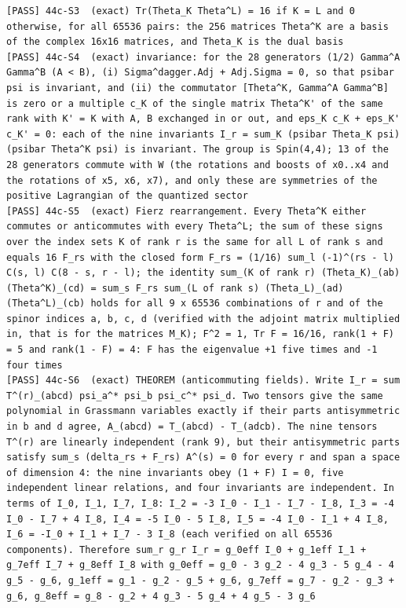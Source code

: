 \documentclass[
  10pt,
]{article}
\begin{document}
\begin{verbatim}
[PASS] 44c-S3  (exact) Tr(Theta_K Theta^L) = 16 if K = L and 0 otherwise, for all 65536 pairs: the 256 matrices Theta^K are a basis of the complex 16x16 matrices, and Theta_K is the dual basis
[PASS] 44c-S4  (exact) invariance: for the 28 generators (1/2) Gamma^A Gamma^B (A < B), (i) Sigma^dagger.Adj + Adj.Sigma = 0, so that psibar psi is invariant, and (ii) the commutator [Theta^K, Gamma^A Gamma^B] is zero or a multiple c_K of the single matrix Theta^K' of the same rank with K' = K with A, B exchanged in or out, and eps_K c_K + eps_K' c_K' = 0: each of the nine invariants I_r = sum_K (psibar Theta_K psi)(psibar Theta^K psi) is invariant. The group is Spin(4,4); 13 of the 28 generators commute with W (the rotations and boosts of x0..x4 and the rotations of x5, x6, x7), and only these are symmetries of the positive Lagrangian of the quantized sector
[PASS] 44c-S5  (exact) Fierz rearrangement. Every Theta^K either commutes or anticommutes with every Theta^L; the sum of these signs over the index sets K of rank r is the same for all L of rank s and equals 16 F_rs with the closed form F_rs = (1/16) sum_l (-1)^(rs - l) C(s, l) C(8 - s, r - l); the identity sum_(K of rank r) (Theta_K)_(ab) (Theta^K)_(cd) = sum_s F_rs sum_(L of rank s) (Theta_L)_(ad) (Theta^L)_(cb) holds for all 9 x 65536 combinations of r and of the spinor indices a, b, c, d (verified with the adjoint matrix multiplied in, that is for the matrices M_K); F^2 = 1, Tr F = 16/16, rank(1 + F) = 5 and rank(1 - F) = 4: F has the eigenvalue +1 five times and -1 four times
[PASS] 44c-S6  (exact) THEOREM (anticommuting fields). Write I_r = sum T^(r)_(abcd) psi_a^* psi_b psi_c^* psi_d. Two tensors give the same polynomial in Grassmann variables exactly if their parts antisymmetric in b and d agree, A_(abcd) = T_(abcd) - T_(adcb). The nine tensors T^(r) are linearly independent (rank 9), but their antisymmetric parts satisfy sum_s (delta_rs + F_rs) A^(s) = 0 for every r and span a space of dimension 4: the nine invariants obey (1 + F) I = 0, five independent linear relations, and four invariants are independent. In terms of I_0, I_1, I_7, I_8: I_2 = -3 I_0 - I_1 - I_7 - I_8, I_3 = -4 I_0 - I_7 + 4 I_8, I_4 = -5 I_0 - 5 I_8, I_5 = -4 I_0 - I_1 + 4 I_8, I_6 = -I_0 + I_1 + I_7 - 3 I_8 (each verified on all 65536 components). Therefore sum_r g_r I_r = g_0eff I_0 + g_1eff I_1 + g_7eff I_7 + g_8eff I_8 with g_0eff = g_0 - 3 g_2 - 4 g_3 - 5 g_4 - 4 g_5 - g_6, g_1eff = g_1 - g_2 - g_5 + g_6, g_7eff = g_7 - g_2 - g_3 + g_6, g_8eff = g_8 - g_2 + 4 g_3 - 5 g_4 + 4 g_5 - 3 g_6

\end{verbatim}
\end{document}
